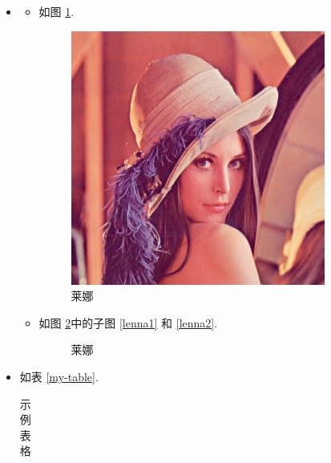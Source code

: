 \documentclass{assignment}
\begin{document}
    \begin{sol}
        \begin{itemize}
            \item[(1)]
            \begin{itemize}
                \item[(a)] 如图 \ref{Lenna}.
                \begin{figure}[hbt!]
                    \centering
                    \includegraphics[width=.2\textwidth]{Lenna.jpg}
                    \caption{莱娜}
                    \label{Lenna}
                \end{figure}
                \item[(b)] 如图 \ref{Lenna2}中的子图 \ref{lenna1} 和 \ref{lenna2}.
                \begin{figure}[hbt!]
                    \centering
                    \caption{莱娜}
                    \label{Lenna2}
                \end{figure}
            \end{itemize}
            \item[(2)] 如表 \ref{my-table}.
            \begin{center}
                \begin{longtable}{ccccc}
                    \caption{示例表格}

\end{longtable}
\end{center}
\end{itemize}
\end{sol}
\end{document}

